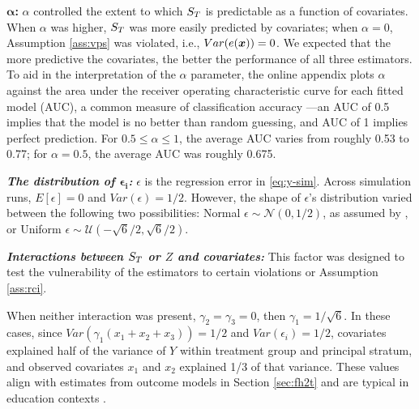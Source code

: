 \documentclass[]{article}
\begin{document}
$\bm{\alpha}$\textbf{:} $\alpha$ controlled the extent to which $S_T$ is predictable as a function of covariates. When $\alpha$ was higher, $S_T$ was more easily predicted by covariates; when $\alpha=0$, Assumption \ref{ass:vps} was violated, i.e., $Var(e(\bm{x}))=0$. We expected that the more predictive the covariates, the better the performance of all three estimators.
To aid in the interpretation of the $\alpha$ parameter, the online appendix plots $\alpha$ against the area under the receiver operating characteristic curve for each fitted model (AUC), a common measure of classification accuracy \citep{bradley1997use}---an AUC of 0.5 implies that the model is no better than random guessing, and AUC of 1 implies perfect prediction. For $0.5\le \alpha \le 1$, the average AUC varies from roughly 0.53 to 0.77; for $\alpha=0.5$, the average AUC was roughly 0.675.


\textbf{\emph{The distribution of $\bm{\epsilon_i}$:}} $\epsilon$ is the regression error in \eqref{eq:y-sim}. Across simulation runs, $E[\epsilon]=0$ and $Var(\epsilon)=1/2$. However, the shape of $\epsilon$'s distribution varied between the following two possibilities:
Normal $\epsilon\sim\mathcal{N}(0,1/2)$, as assumed by \pmm, or Uniform $\epsilon\sim\mathcal{U}(-\sqrt{6}/2,\sqrt{6}/2)$.



\textbf{\emph{Interactions between $S_T$ or $Z$ and covariates:}} This factor was designed to test the vulnerability of the estimators to certain violations or Assumption \ref{ass:rci}. 

When neither interaction was present, $\gamma_2=\gamma_3=0$, then $\gamma_1=1/\sqrt{6}$.
In these cases, since  $Var(\gamma_1(x_1+x_2+x_3))=1/2$ and $Var(\epsilon_i)=1/2$, covariates explained half of the variance of $Y$ within treatment group and principal stratum, and observed covariates $x_1$ and $x_2$ explained 1/3 of that variance.
These values align with estimates from outcome models in Section \ref{sec:fh2t} and are typical in education contexts \cite{hedgesHedberg}.
\end{document}
